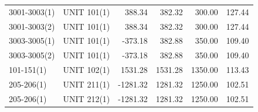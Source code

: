 \documentclass[10pt]{report}
\begin{document}
\begin{table}[H]
{\begin{tabular}{llrrrr}
3001-3003(1) & UNIT 101(1) & 388.34 & 382.32 & 300.00 & 127.44 \\
3001-3003(2) & UNIT 101(1) & 388.34 & 382.32 & 300.00 & 127.44 \\
3003-3005(1) & UNIT 101(1) & -373.18 & 382.88 & 350.00 & 109.40 \\
3003-3005(2) & UNIT 101(1) & -373.18 & 382.88 & 350.00 & 109.40 \\
101-151(1) & UNIT 102(1) & 1531.28 & 1531.28 & 1350.00 & 113.43 \\
205-206(1) & UNIT 211(1) & -1281.32 & 1281.32 & 1250.00 & 102.51 \\
205-206(1) & UNIT 212(1) & -1281.32 & 1281.32 & 1250.00 & 102.51 \\
\bottomrule
\end{tabular}}
\end{table}
\end{document}
